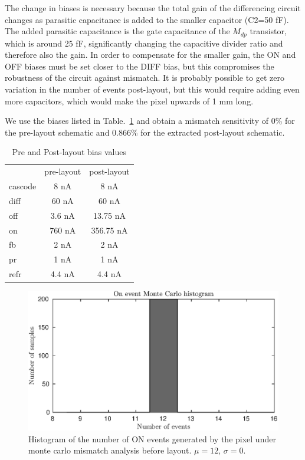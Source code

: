 The change in biases is necessary because the total gain of the differencing circuit changes as parasitic capacitance is
added to the smaller capacitor (C2=50 fF). The added parasitic capacitance is the gate capacitance of the \(M_{dp}\) transistor,
which is around 25 fF, significantly changing the capacitive divider ratio and therefore also the gain.
In order to compensate for the smaller gain, the ON and OFF biases must be set closer to the DIFF bias, but
this compromises the robustness of the circuit against mismatch. It is probably possible to get zero variation
in the number of events post-layout, but this would require adding even more capacitors, which would make the pixel
upwards of 1 mm long.

We use the biases listed in Table.~\ref{tbl:biases} and obtain a mismatch sensitivity of 0\% for the pre-layout schematic
and \(0.866\)\% for the extracted post-layout schematic.
\begin{table}
    \center
    \caption{Pre and Post-layout bias values}
    \begin{tabular}{l | c | c}
            & pre-layout & post-layout \\
        cascode & 8 nA & 8 nA \\
        diff & 60 nA & 60 nA \\
        off & 3.6 nA & 13.75 nA \\
        on & 760 nA & 356.75 nA \\
        fb & 2 nA & 2 nA \\
        pr & 1 nA & 1 nA \\
        refr & 4.4 nA & 4.4 nA \\
    \end{tabular}
    \label{tbl:biases}
\end{table}
\begin{figure}
    \center
    \includegraphics{pre-on-200-MC.eps}
    \caption{Histogram of the number of ON events generated by the pixel under monte carlo mismatch analysis before layout. \(\mu=12\), \(\sigma=0\).}
    \label{fig:pre-on-MC}
\end{figure}
